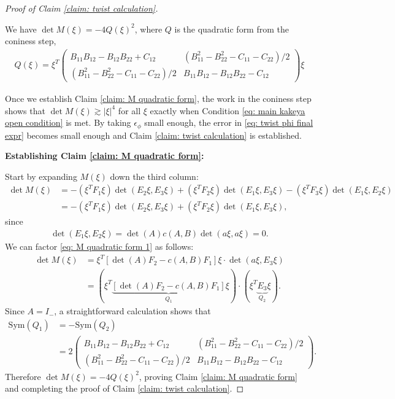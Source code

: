 \documentclass[10pt,a4paper]{amsart}
\newcommand{\sym}{\mathrm{Sym}}
\begin{document}
\begin{proof}[Proof of Claim \ref{claim: twist calculation}]
    \begin{claim}\label{claim: M quadratic form}
        We have $\det M(\xi) = -4 Q(\xi)^2$, where $Q$ is the quadratic form from the coniness step,
        \begin{align}
            Q(\xi) = \xi^T 
            \begin{pmatrix}
                B_{11} B_{12}-B_{12} B_{22}  + C_{12} & (B_{11}^2 - B_{22}^2 - C_{11} - C_{22})/2 \\
                (B_{11}^2 - B_{22}^2 - C_{11} - C_{22})/2 & 
                B_{11} B_{12} - B_{12} B_{22} - C_{12}
            \end{pmatrix}
            \xi
        \end{align}
    \end{claim}
    Once we establish Claim \ref{claim: M quadratic form}, the work in the coniness step shows that $\det M(\xi) \gtrsim |\xi|^4$ for all $\xi$ exactly when Condition \eqref{eq: main kakeya open condition} is met. By taking $\epsilon_\phi$ small enough, the error in \eqref{eq: twist phi final expr} becomes small enough and Claim \ref{claim: twist calculation} is established. 

    \medskip

    \noindent \textbf{Establishing Claim \ref{claim: M quadratic form}: }

    Start by expanding $M(\xi)$ down the third column: 
    \begin{align}
        \det M(\xi) &= -(\xi^T F_1 \xi) \det(E_2 \xi, E_3 \xi) + (\xi^T F_2 \xi) \det(E_1 \xi, E_3 \xi) - (\xi^T F_3 \xi) \det(E_1 \xi, E_2 \xi) \\
        &= -(\xi^T F_1 \xi) \det(E_2 \xi, E_3 \xi) + (\xi^T F_2 \xi) \det(E_1 \xi, E_3 \xi), \label{eq: M quadratic form 1}
    \end{align}
    since 
    \begin{align}
        \det(E_1 \xi, E_2 \xi) = \det(A) c(A,B) \det(a\xi,a\xi) = 0.
    \end{align}
    We can factor \eqref{eq: M quadratic form 1} as follows: 
    \begin{align}
        \det M(\xi) &= \xi^T [\det(A) F_2 - c(A,B) F_1] \xi \cdot \det(a\xi, E_3 \xi) \\
        &= (\xi^T \underbrace{[\det(A) F_2 - c(A,B) F_1]}_{Q_1}\xi) \cdot (\xi^T \underbrace{E_3}_{Q_2} \xi). 
    \end{align}
    Since $A=I_-$, a straightforward calculation shows that
    \begin{align}
        \sym(Q_1) &= -\sym(Q_2) \\ &= 2
        \begin{pmatrix}
                B_{11} B_{12}-B_{12} B_{22}  + C_{12} & (B_{11}^2 - B_{22}^2 - C_{11} - C_{22})/2 \\
                (B_{11}^2 - B_{22}^2 - C_{11} - C_{22})/2 & 
                B_{11} B_{12} - B_{12} B_{22} - C_{12}
            \end{pmatrix}.
    \end{align}
    Therefore $\det M(\xi) = - 4Q(\xi)^2$, proving Claim \ref{claim: M quadratic form} and completing the proof of Claim \ref{claim: twist calculation}.
\end{proof}
\end{document}

